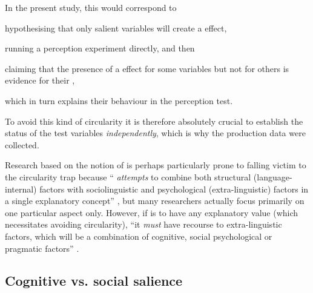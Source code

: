 In the present study, this would correspond to
\begin{inparaenum}[(1)]
	\item hypothesising that only salient variables will create a  effect,
	\item running a perception experiment directly, and then
	\item claiming that the presence of a  effect for some variables but not for others is evidence for their ,
	\item which in turn explains their behaviour in the perception test.
\end{inparaenum}
To avoid this kind of circularity it is therefore absolutely crucial to establish the  status of the test variables \emph{independently}, which is why the production data were collected.

Research based on the notion of  is perhaps particularly prone to falling victim to the circularity trap because `` \emph{attempts} to combine both structural (language-internal) factors with sociolinguistic and psychological (extra-linguistic) factors in a single explanatory concept'' \parencite[83, my emphasis]{kerswillwilliams2002}, but many researchers actually focus primarily on one particular aspect only.
However, if  is to have any explanatory value (which necessitates avoiding circularity), ``it \emph{must} have recourse to extra-linguistic factors, which will be a combination of cognitive, social psychological or pragmatic factors'' \parencite[83, my emphasis]{kerswillwilliams2002}.

		\subsection{Cognitive vs. social salience}
		\label{sec.sal.sal.cog}

